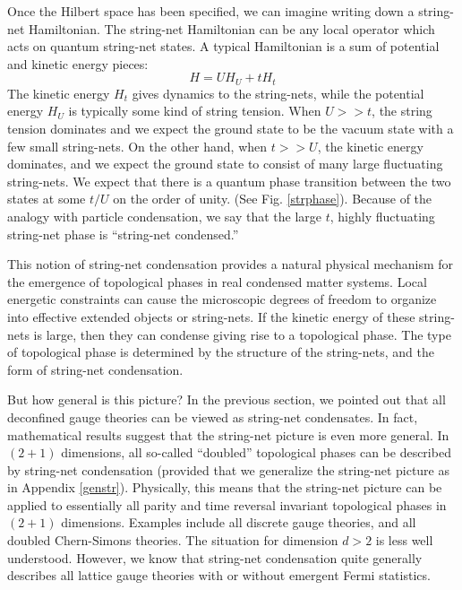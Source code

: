 \documentclass[aps,twocolumn,groupedaddress,showpacs,floatfix]{revtex4}
\begin{document}
Once the Hilbert space has been specified, we can imagine writing down
a string-net Hamiltonian. The string-net Hamiltonian can be any local operator
which acts on quantum string-net states. A typical Hamiltonian is a sum of
potential and kinetic energy pieces: 
\begin{equation}
H = U H_{U} + t H_{t}
\label{genh}
\end{equation} 
The kinetic energy $H_{t}$ gives dynamics to the string-nets, while the
potential energy $H_{U}$ is typically some kind of string tension. When $U >>
t$, the string tension dominates and we expect the ground state to be the
vacuum state with a few small string-nets.  On the other hand, when $t >> U$,
the kinetic energy dominates, and we expect the ground state to consist of
many large fluctuating string-nets.  We expect that there is a quantum phase
transition between the two states at some $t/U$ on the order of unity.  (See
Fig. \ref{strphase}). Because of the analogy with particle condensation, we
say that the large $t$, highly fluctuating string-net phase is ``string-net
condensed.''

This notion of string-net condensation provides a natural physical mechanism 
for the emergence of topological phases in real condensed matter systems. Local
energetic constraints can cause the microscopic degrees of freedom to organize 
into effective extended objects or string-nets. If the kinetic energy of these 
string-nets is large, then they can condense giving rise to a topological 
phase. The type of topological phase is determined by the structure of the 
string-nets, and the form of string-net condensation.

But how general is this picture? In the previous section, we pointed out
that all deconfined gauge theories can be viewed as string-net condensates.
In fact, mathematical results suggest that the string-net picture is even
more general. In $(2+1)$ dimensions, all so-called ``doubled'' topological 
phases can be described by string-net condensation (provided that we
generalize the string-net picture as in Appendix \ref{genstr}). \cite{Tur94} 
Physically, this means that the string-net picture can be applied to 
essentially all parity and time reversal invariant topological phases in 
$(2+1)$ dimensions. Examples include all discrete gauge theories, and all 
doubled Chern-Simons theories. The situation for dimension $d > 2$ is less well
understood. However, we know that string-net condensation quite generally 
describes all lattice gauge theories with or without emergent Fermi statistics.
\end{document}
